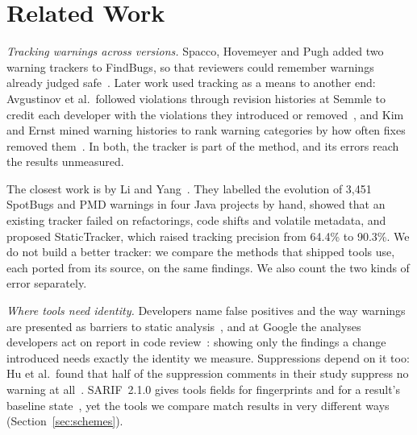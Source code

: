 \section{Related Work}\label{sec:related}

\textit{Tracking warnings across versions.} Spacco, Hovemeyer and Pugh added two warning trackers to FindBugs, so that reviewers could remember warnings already judged safe~\cite{spacco2006}. Later work used tracking as a means to another end: Avgustinov et al.\ followed violations through revision histories at Semmle to credit each developer with the violations they introduced or removed~\cite{avgustinov2015}, and Kim and Ernst mined warning histories to rank warning categories by how often fixes removed them~\cite{kim2007}. In both, the tracker is part of the method, and its errors reach the results unmeasured.

The closest work is by Li and Yang~\cite{li2022statictracker}. They labelled the evolution of 3,451 SpotBugs and PMD warnings in four Java projects by hand, showed that an existing tracker failed on refactorings, code shifts and volatile metadata, and proposed StaticTracker, which raised tracking precision from 64.4\% to 90.3\%. We do not build a better tracker: we compare the methods that shipped tools use, each ported from its source, on the same findings. We also count the two kinds of error separately.

\textit{Where tools need identity.} Developers name false positives and the way warnings are presented as barriers to static analysis~\cite{johnson2013}, and at Google the analyses developers act on report in code review~\cite{sadowski2015tricorder,sadowski2018lessons}: showing only the findings a change introduced needs exactly the identity we measure. Suppressions depend on it too: Hu et al.\ found that half of the suppression comments in their study suppress no warning at all~\cite{hu2025suppressed}. SARIF~2.1.0 gives tools fields for fingerprints and for a result's baseline state~\cite{sarif2020}, yet the tools we compare match results in very different ways (Section~\ref{sec:schemes}).
